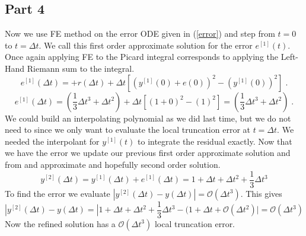 \documentclass[11pt,oneside,a4paper]{article}
\begin{document}
\subsection{Part 4}
Now we use FE method on the error ODE given in (\ref{error}) and step from $t=0$ to $t=\Delta t$. We call this first order approximate solution for the error $e^{[1]}(t)$. Once again applying FE to the Picard integral corresponds to applying the Left-Hand Riemann sum to the integral. 
\begin{equation}
e^{[1]}(\Delta t)=+r(\Delta t)+\Delta t [(y^{[1]}(0)+e(0))^2-(y^{[1]}(0))^2]\;.
\end{equation}
\begin{equation}
e^{[1]}(\Delta t)=(\frac{1}{3}\Delta t^3+\Delta t^2)+\Delta t[ (1+0)^2-(1)^2]=(\frac{1}{3}\Delta t^3+\Delta t^2)\;.
\end{equation}
We could build an interpolating polynomial as we did last time, but we do not need to since we only want to evaluate the local truncation error at $t=\Delta t$. We needed the interpolant for $y^{[1]}(t)$  to integrate the residual exactly. Now that we have the error we update our previous first order approximate solution and from and approximate and hopefully second order solution.
\begin{equation}
y^{[2]}(\Delta t)=y^{[1]}(\Delta t)+e^{[1]}(\Delta t)=1+\Delta t + \Delta t^2 +\frac{1}{3} \Delta t^3
\end{equation}
To find the error we evaluate $|y^{[2]}(\Delta t)-y(\Delta t)|=\mathcal{O}(\Delta t ^3)$. This gives
\begin{equation}
|y^{[2]}(\Delta t)-y(\Delta t)=|1 + \Delta t +\Delta t^2 +\frac{1}{3}\Delta t^3 - (1 +\Delta t +\mathcal{O}(\Delta t^2)|=\mathcal{O}(\Delta t^3)
\end{equation}
Now the refined solution has a $\mathcal{O}(\Delta t^3)$ local truncation error.



   

\end{document}
